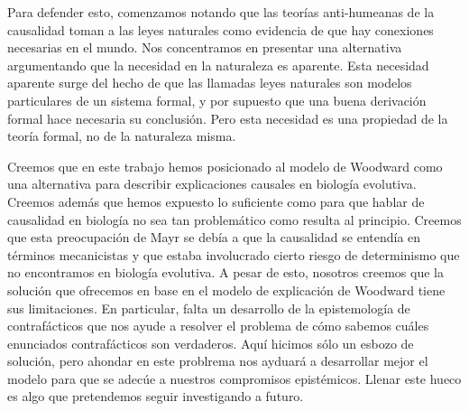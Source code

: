 Para defender esto, comenzamos notando que las teorías anti-humeanas de la causalidad toman a las leyes naturales como evidencia de que hay conexiones necesarias en el mundo. Nos concentramos en presentar una alternativa argumentando que la necesidad en la naturaleza es aparente. Esta necesidad aparente surge del hecho de que las llamadas leyes naturales son modelos particulares de un sistema formal, y por supuesto que una buena derivación formal hace necesaria su conclusión. Pero esta necesidad es una propiedad de la teoría formal, no de la naturaleza misma.

Creemos que en este trabajo hemos posicionado al modelo de Woodward como una alternativa para describir explicaciones causales en biología evolutiva. Creemos además que hemos expuesto lo suficiente como para que hablar de causalidad en biología no sea tan problemático como resulta al principio. Creemos que esta preocupación de Mayr se debía a que la causalidad se entendía en términos mecanicistas y que estaba involucrado cierto riesgo de determinismo que no encontramos en biología evolutiva. A pesar de esto, nosotros creemos que la solución que ofrecemos en base en el modelo de explicación de Woodward tiene sus limitaciones. En particular, falta un desarrollo de la epistemología de contrafácticos que nos ayude a resolver el problema de cómo sabemos cuáles enunciados contrafácticos son verdaderos. Aquí hicimos sólo un esbozo de solución, pero ahondar en este problrema nos ayduará a desarrollar mejor el modelo para que se adecúe a nuestros compromisos epistémicos. Llenar este hueco es algo que pretendemos seguir investigando a futuro. 


